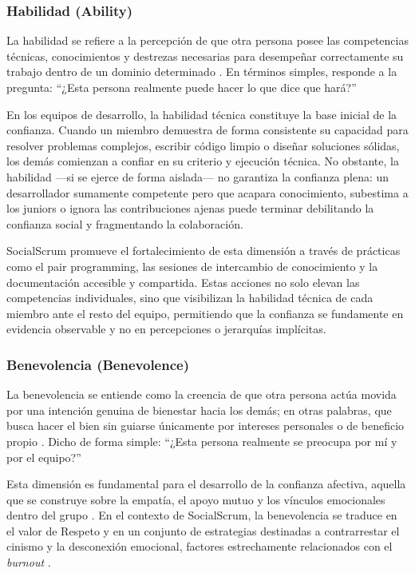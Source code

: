 \subsubsection{Habilidad (Ability)}

La habilidad se refiere a la percepción de que otra persona posee las competencias técnicas, conocimientos y destrezas necesarias para desempeñar correctamente su trabajo dentro de un dominio determinado \cite{mayer_integrative_1995}.
En términos simples, responde a la pregunta: ``¿Esta persona realmente puede hacer lo que dice que hará?''

En los equipos de desarrollo, la habilidad técnica constituye la base inicial de la confianza.
Cuando un miembro demuestra de forma consistente su capacidad para resolver problemas complejos, escribir código limpio o diseñar soluciones sólidas, los demás comienzan a confiar en su criterio y ejecución técnica.
No obstante, la habilidad —si se ejerce de forma aislada— no garantiza la confianza plena: un desarrollador sumamente competente pero que acapara conocimiento, subestima a los juniors o ignora las contribuciones ajenas puede terminar debilitando la confianza social y fragmentando la colaboración.

SocialScrum promueve el fortalecimiento de esta dimensión a través de prácticas como el pair programming, las sesiones de intercambio de conocimiento y la documentación accesible y compartida.
Estas acciones no solo elevan las competencias individuales, sino que visibilizan la habilidad técnica de cada miembro ante el resto del equipo, permitiendo que la confianza se fundamente en evidencia observable y no en percepciones o jerarquías implícitas.

\subsubsection{Benevolencia (Benevolence)}

La benevolencia se entiende como la creencia de que otra persona actúa movida por una intención genuina de bienestar hacia los demás; en otras palabras, que busca hacer el bien sin guiarse únicamente por intereses personales o de beneficio propio \cite{mayer_integrative_1995}.
Dicho de forma simple: ``¿Esta persona realmente se preocupa por mí y por el equipo?''

Esta dimensión es fundamental para el desarrollo de la confianza afectiva, aquella que se construye sobre la empatía, el apoyo mutuo y los vínculos emocionales dentro del grupo \cite{wilson_all_2006}.
En el contexto de SocialScrum, la benevolencia se traduce en el valor de Respeto y en un conjunto de estrategias destinadas a contrarrestar el cinismo y la desconexión emocional, factores estrechamente relacionados con el \textit{burnout} \cite{tulili2022burnout}.

